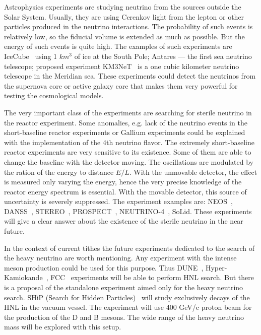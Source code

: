 \documentclass[../main.tex]{subfiles}
\begin{document}
Astrophysics experiments are studying neutrino from the sources outside the Solar System. Usually, they are using Cerenkov light from the lepton or other particles produced in the neutrino interactions. The probability of such events is relatively low, so the fiducial volume is extended as much as possible. But the energy of such events is quite high. The examples of such experiments are IceCube~\cite{Aartsen2017} using 1 $km^3$ of ice at the South Pole; Antares --- the first sea neutrino telescope; proposed experiment KM3NeT~\cite{LeBreton2019} is a one cubic kilometer neutrino telescope in the Meridian sea. These experiments could detect the neutrinos from the supernova core or active galaxy core that makes them very powerful for testing the cosmological models.

The very important class of the experiments are searching for sterile neutrino in the reactor experiment. Some anomalies, e.g. lack of the neutrino events in the short-baseline reactor experiments or Gallium experiments could be explained with the implementation of the 4th neutrino flavor. The extremely short-baseline reactor experiments are very sensitive to its existence. Some of them are able to change the baseline with the detector moving. The oscillations are modulated by the ration of the energy to distance $E/L$. With the unmovable detector, the effect is measured only varying the energy, hence the very precise knowledge of the reactor energy spectrum is essential. With the movable detector, this source of uncertainty is severely suppressed. The experiment examples are: NEOS~\cite{Ko2017}, DANSS~\cite{Alekseev2018}, STEREO~\cite{Almazan2018}, PROSPECT~\cite{Ashenfelter2018}, NEUTRINO-4~\cite{Serebrov2015}, SoLid. These experiments will give a clear answer about the existence of the sterile neutrino in the near future.

In the context of current tithes the future experiments dedicated to the search of the heavy neutrino are worth mentioning. Any experiment with the intense meson production could be used for this purpose. Thus DUNE~\cite{Acciarri2016}, Hyper-Kamiokande~\cite{Proto-Collaboration2018}, FCC~\cite{Collaboration2019} experiments will be able to perform HNL search. But there is a proposal of the standalone experiment aimed only for the heavy neutrino search. SHiP (Search for Hidden Particles)~\cite{SHiPCollaboration2018a} will study exclusively decays of the HNL in the vacuum vessel. The experiment will use 400 GeV/c proton beam for the production of the D and B mesons. The wide range of the heavy neutrino mass will be explored with this setup.
\end{document}
